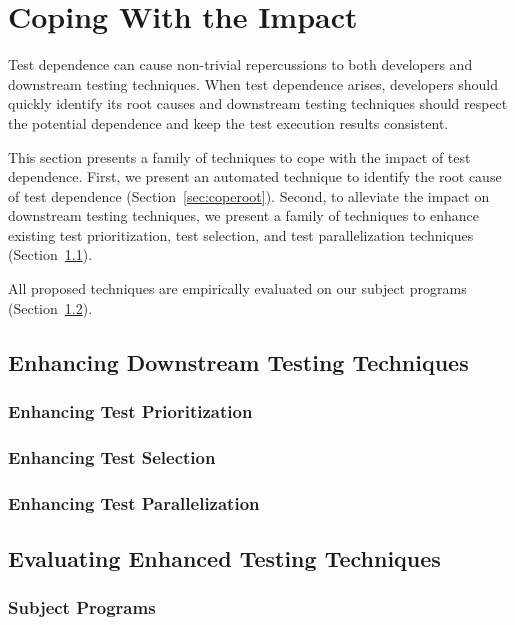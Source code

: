 \section{Coping With the Impact}
\label{sec:cope}

Test dependence can cause non-trivial repercussions
to both developers and downstream testing techniques.
When test dependence arises, developers should quickly
identify its root causes and downstream testing techniques
should respect the potential dependence and keep the
test execution results consistent.

This section presents a family of techniques to cope with the
impact of test dependence. First, we present an automated
technique to identify the root cause of test dependence
(Section~\ref{sec:coperoot}). Second, to alleviate the
impact on downstream testing techniques, we present a family
of techniques to enhance existing test prioritization,
test selection, and test parallelization techniques (Section~\ref{sec:copeenhance}).

All proposed techniques are empirically evaluated on
our subject programs (Section~\ref{sec:evaluation}).


\subsection{Enhancing Downstream Testing Techniques}
\label{sec:copeenhance}


\subsubsection{Enhancing Test Prioritization}

\subsubsection{Enhancing Test Selection}

\subsubsection{Enhancing Test Parallelization}

\subsection{Evaluating Enhanced Testing Techniques}
\label{sec:evaluation}

\subsubsection{Subject Programs}

